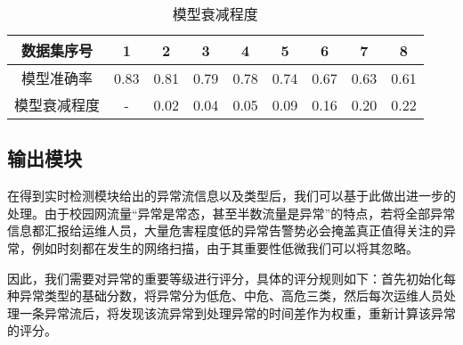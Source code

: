 \begin{table}[htb]
  \centering
  \caption{模型衰减程度}
  \label{模型衰减程度}
      \begin{tabular}{c|cccccccc}
      \toprule  %
      数据集序号&1 & 2 &3 & 4 &5 & 6&7 & 8\\
      \hline  %
      模型准确率& 0.83 & 0.81& 0.79 & 0.78& 0.74 & 0.67& 0.63 & 0.61\\
      \hline %
      模型衰减程度& - & 0.02& 0.04 & 0.05& 0.09 & 0.16& 0.20 & 0.22\\
      \bottomrule %
      \end{tabular}
\end{table}


\subsection{输出模块}
在得到实时检测模块给出的异常流信息以及类型后，我们可以基于此做出进一步的处理。由于校园网流量“异常是常态，甚至半数流量是异常”的特点，若将全部异常信息都汇报给运维人员，大量危害程度低的异常告警势必会掩盖真正值得关注的异常，例如时刻都在发生的网络扫描，由于其重要性低微我们可以将其忽略。

因此，我们需要对异常的重要等级进行评分，具体的评分规则如下：首先初始化每种异常类型的基础分数，将异常分为低危、中危、高危三类，然后每次运维人员处理一条异常流后，将发现该流异常到处理异常的时间差作为权重，重新计算该异常的评分。





